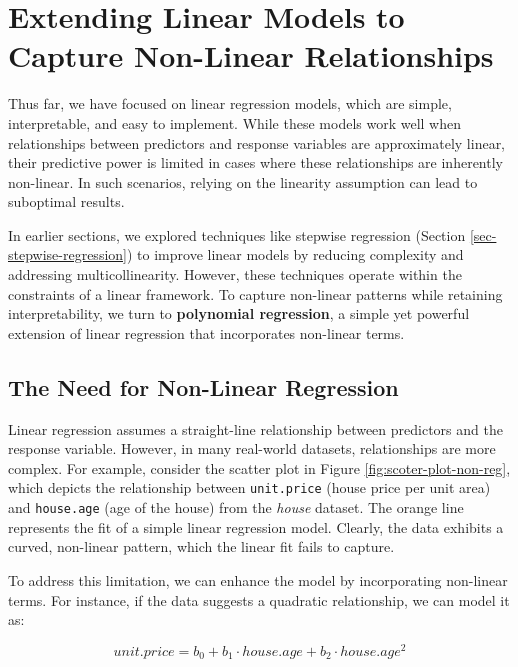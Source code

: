 \documentclass[
]{book}
\newcommand{\passthrough}[1]{#1}
\theoremstyle{definition}
\theoremstyle{definition}
\theoremstyle{definition}
\theoremstyle{definition}
\theoremstyle{remark}
\begin{document}
\section{Extending Linear Models to Capture Non-Linear Relationships}\label{extending-linear-models-to-capture-non-linear-relationships}

Thus far, we have focused on linear regression models, which are simple, interpretable, and easy to implement. While these models work well when relationships between predictors and response variables are approximately linear, their predictive power is limited in cases where these relationships are inherently non-linear. In such scenarios, relying on the linearity assumption can lead to suboptimal results.

In earlier sections, we explored techniques like stepwise regression (Section \ref{sec-stepwise-regression}) to improve linear models by reducing complexity and addressing multicollinearity. However, these techniques operate within the constraints of a linear framework. To capture non-linear patterns while retaining interpretability, we turn to \textbf{polynomial regression}, a simple yet powerful extension of linear regression that incorporates non-linear terms.

\subsection*{The Need for Non-Linear Regression}\label{the-need-for-non-linear-regression}

Linear regression assumes a straight-line relationship between predictors and the response variable. However, in many real-world datasets, relationships are more complex. For example, consider the scatter plot in Figure \ref{fig:scoter-plot-non-reg}, which depicts the relationship between \passthrough{\lstinline!unit.price!} (house price per unit area) and \passthrough{\lstinline!house.age!} (age of the house) from the \emph{house} dataset. The orange line represents the fit of a simple linear regression model. Clearly, the data exhibits a curved, non-linear pattern, which the linear fit fails to capture.

To address this limitation, we can enhance the model by incorporating non-linear terms. For instance, if the data suggests a quadratic relationship, we can model it as:

\[
unit.price = b_0 + b_1 \cdot house.age + b_2 \cdot house.age^2
\]
\end{document}
